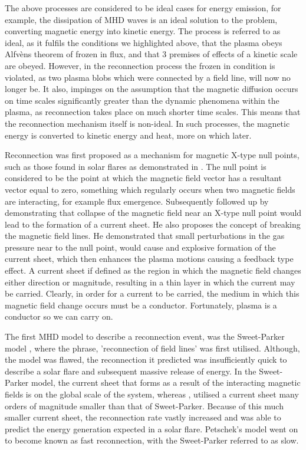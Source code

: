 The above processes are considered to be ideal cases for energy emission, for example, the dissipation of MHD waves is an ideal solution to the problem, converting magnetic energy into kinetic energy.
The process is referred to as ideal, as it fulfils the conditions we highlighted above, that the plasma obeys Alfv{\`e}ns theorem of frozen in flux, and that 3 premises of effects of a kinetic scale are obeyed.
However, in the reconnection process the frozen in condition is violated, as two plasma blobs which were connected by a field line, will now no longer be.
It also, impinges on the assumption that the magnetic diffusion occurs on time scales significantly greater than the dynamic phenomena within the plasma, as reconnection takes place on much shorter time scales.
This means that the reconnection mechanism itself is non-ideal.
In such processes, the magnetic energy is converted to kinetic energy and heat, more on which later.

Reconnection was first proposed as a mechanism for magnetic X-type null points, such as those found in solar flares as demonstrated in  \cite{Giovanelli1946}.
The null point is considered to be the point at which the magnetic field vector has a resultant vector equal to zero, something which regularly occurs when two magnetic fields are interacting, for example flux emergence.
Subsequently followed up by \cite{Dungey1953} demonstrating that collapse of the magnetic field near an X-type null point would lead to the formation of a current sheet.
He also proposes the concept of breaking the magnetic field lines.
He demonstrated that small perturbations in the gas pressure near to the null point, would cause and explosive formation of the current sheet, which then enhances the plasma motions causing a feedback type effect.
A current sheet if defined as the region in which the magnetic field changes either direction or magnitude, resulting in a thin layer in which the current may be carried.
Clearly, in order for a current to be carried, the medium in which this magnetic field change occurs must be a conductor.
Fortunately, plasma is a conductor so we can carry on. 

The first MHD model to describe a reconnection event, was the Sweet-Parker model \citep{Sweet1958, Parker1957}, where the phrase, 'reconnection of field lines' was first utilised.
Although, the model was flawed, the reconnection it predicted was insufficiently quick to describe a solar flare and subsequent massive release of energy.
In the Sweet-Parker model, the current sheet that forms as a result of the interacting magnetic fields is on the global scale of the system, whereas \cite{Petschek1964}, utilised a current sheet many orders of magnitude smaller than that of Sweet-Parker.
Because of this much smaller current sheet, the reconnection rate vastly increased and was able to predict the energy generation expected in a solar flare. 
Petschek's model went on to become known as fast reconnection, with the Sweet-Parker referred to as slow.

